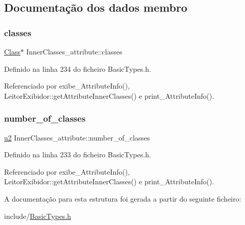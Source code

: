 \subsection{Documentação dos dados membro}
\mbox{\label{structInnerClasses__attribute_ab9d6da51f62c9886a96d40719c81b103}} 
\subsubsection{\texorpdfstring{classes}{classes}}
{\footnotesize\ttfamily \hyperlink{structClass}{Class}$\ast$ Inner\+Classes\+\_\+attribute\+::classes}



Definido na linha 234 do ficheiro Basic\+Types.\+h.



Referenciado por exibe\+\_\+\+Attribute\+Info(), Leitor\+Exibidor\+::get\+Attribute\+Inner\+Classes() e print\+\_\+\+Attribute\+Info().

\mbox{\label{structInnerClasses__attribute_ae1ab3ffc94d37479a2f58cb801674191}} 
\subsubsection{\texorpdfstring{number\+\_\+of\+\_\+classes}{number\_of\_classes}}
{\footnotesize\ttfamily \hyperlink{BasicTypes_8h_a732cde1300aafb73b0ea6c2558a7a54f}{u2} Inner\+Classes\+\_\+attribute\+::number\+\_\+of\+\_\+classes}



Definido na linha 233 do ficheiro Basic\+Types.\+h.



Referenciado por exibe\+\_\+\+Attribute\+Info(), Leitor\+Exibidor\+::get\+Attribute\+Inner\+Classes() e print\+\_\+\+Attribute\+Info().



A documentação para esta estrutura foi gerada a partir do seguinte ficheiro\+:\begin{DoxyCompactItemize}
\item 
include/\hyperlink{BasicTypes_8h}{Basic\+Types.\+h}\end{DoxyCompactItemize}
